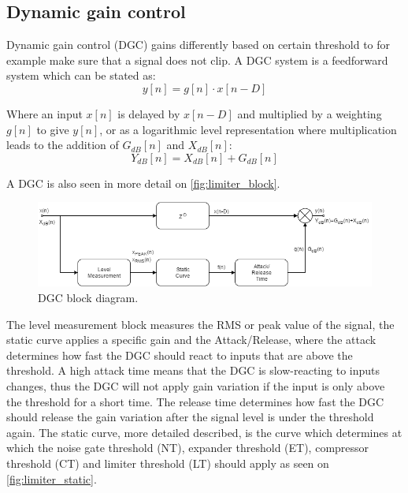 \subsection*{Dynamic gain control}
Dynamic gain control (DGC) gains differently based on certain threshold to for example make sure that a signal does not clip. A DGC system is a feedforward system which can be stated as:
\begin{equation}
y[n] = g[n]\cdot x[n-D]
\end{equation}

Where an input $x[n]$ is delayed by $x[n-D]$ and multiplied by a weighting $g[n]$ to give $y[n]$, or as a logarithmic level representation where multiplication leads to the addition of $G_{dB}[n]$ and $X_{dB}[n]$:
\begin{equation}
Y_{dB}[n] = X_{dB}[n] + G_{dB}[n]
\end{equation}

A DGC is also seen in more detail on \autoref{fig:limiter_block}.

\begin{figure}[H]
\centering
\includegraphics[width=1\textwidth]{figures/Limiter_block.png}
\caption{DGC block diagram.}
\label{fig:limiter_block}
\end{figure}   


The level measurement block measures the RMS or peak value of the signal, the static curve applies a specific gain and the Attack/Release, where the attack determines how fast the DGC should react to inputs that are above the threshold. A high attack time means that the DGC is slow-reacting to inputs changes, thus the DGC will not apply gain variation if the input is only above the threshold for a short time. The release time determines how fast the DGC should release the gain variation after the signal level is under the threshold again.
The static curve, more detailed described, is the curve which determines at which the noise gate threshold (NT), expander threshold (ET), compressor threshold (CT) and limiter threshold (LT) should apply as seen on \autoref{fig:limiter_static}. 

